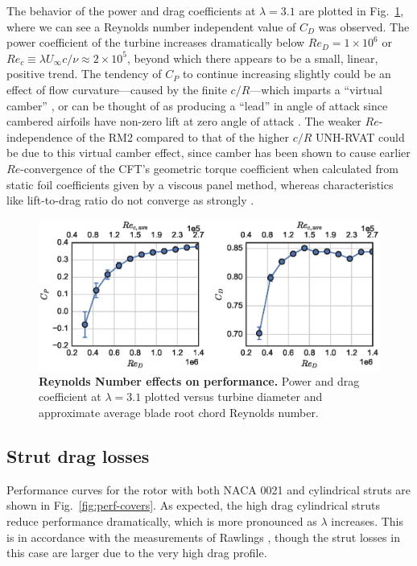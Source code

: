 \documentclass[10pt,letterpaper]{article}
\begin{document}
The behavior of the power and drag coefficients at $\lambda=3.1$ are plotted in
Fig.~\ref{fig:perf-re-dep}, where we can see a Reynolds number independent value
of $C_D$ was observed. The power coefficient of the turbine increases
dramatically below $Re_D = 1 \times 10^6$ or $Re_c \equiv \lambda U_\infty c /
\nu \approx 2 \times 10^5$, beyond which there appears to be a small, linear,
positive trend. The tendency of $C_P$ to continue increasing slightly could be
an effect of flow curvature---caused by the finite $c/R$---which imparts a
``virtual camber'' \cite{Migliore1980}, or can be thought of as producing a
``lead'' in angle of attack since cambered airfoils have non-zero lift at zero
angle of attack \cite{Goude2012}. The weaker $Re$-independence of the RM2
compared to that of the higher $c/R$ UNH-RVAT could be due to this virtual
camber effect, since camber has been shown to cause earlier $Re$-convergence of
the CFT's geometric torque coefficient when calculated from static foil
coefficients given by a viscous panel method, whereas characteristics like
lift-to-drag ratio do not converge as strongly \cite{Bachant2016-RVAT-Re-dep}.

\begin{figure}
    \includegraphics[width=\textwidth]{figures/perf_re_dep.eps}

    \caption{{\bf Reynolds Number effects on performance.} Power and drag
    coefficient at $\lambda=3.1$ plotted versus turbine diameter and approximate
    average blade root chord Reynolds number.}

    \label{fig:perf-re-dep}
\end{figure}


\subsection*{Strut drag losses}

Performance curves for the rotor with both NACA 0021 and cylindrical struts are
shown in Fig.~\ref{fig:perf-covers}. As expected, the high drag cylindrical
struts reduce performance dramatically, which is more pronounced as $\lambda$
increases. This is in accordance with the measurements of Rawlings
\cite{Rawlings2008}, though the strut losses in this case are larger due to the
very high drag profile.
\end{document}
